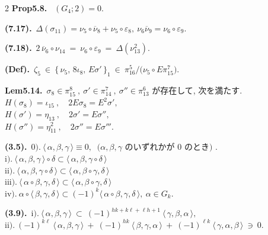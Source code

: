 \documentclass[10pt, leqno]{ltjsarticle}
\newcommand{\ov}[1]{\overline{#1}}
\newcommand{\todai}[2][]{\{\,#2\,\}_{#1}}      %
\newcommand{\todas}[1]{\langle\,#1\,\rangle}
\newcommand{\gen}[1]{\{#1\}}       %
\numberwithin{equation}{section}
\theoremstyle{plain}
\theoremstyle{definition}
\theoremstyle{remark}
\begin{document}
\begin{paracol}{2}
\noindent
\textbf{Prop5.8.}\
\((G_{4};2)=0.\)

\noindent
\textbf{(7.17).}\
\(\Delta(\sigma_{11}) = \nu_5\circ\ov{\nu}_8 + \nu_5\circ\varepsilon_8,\
\nu_6\ov{\nu}_9 = \nu_6\circ\varepsilon_9 .\)

\noindent
\textbf{(7.18).}\
\(2\,\overline{\nu}_{6}\circ \nu_{14}
\ =\ \nu_{6}\circ\varepsilon_{9}
\ =\ \Delta(\nu_{13}^{2}).\)

\noindent
\textbf{(Def).}\
\(\zeta_{5}\ \in\ \todai[1]{\nu_{5},\,8\iota_{8},\,E\sigma'}
\ \in\ \pi^{5}_{16}/\bigl(\nu_{5}\circ E\pi^{7}_{15}\bigr)\).

\noindent
\textbf{Lem5.14.}\
\(\sigma_{8}\in\pi^{8}_{15}\ , \ \sigma'\in\pi^{7}_{14}\ , \ \sigma''\in\pi^{6}_{13}\) 
が存在して, 次を満たす. \\
\(H(\sigma_{8})=\iota_{15} \ ,\quad 2E\sigma_{8}=E^{2}\sigma',\)\\
\(H(\sigma')=\eta_{13} \ ,\quad 2\sigma'=E\sigma'',\)\\
\(H(\sigma'')=\eta_{11}^2 \ ,\quad 2\sigma''=E\sigma''' .\)

\noindent
\textbf{(3.5).}\
\(\text{0).}\ \todas{\alpha, \beta, \gamma}\equiv 0,
\ \text{ ($\alpha,\beta,\gamma$ のいずれかが $0$ のとき) }\).\\
\(\text{i).}\ \todas{\alpha, \beta, \gamma}\circ\delta
\subset \todas{\alpha, \beta, \gamma\circ\delta}\)\\
\(\text{ii).}\ \todas{\alpha, \beta, \gamma\circ\delta}
\subset \todas{\alpha, \beta\circ\gamma, \delta}\)\\
\(\text{iii).}\ \todas{\alpha\circ\beta, \gamma, \delta}
\subset \todas{\alpha, \beta\circ\gamma, \delta}\)\\
\(\text{iv).}\ \alpha\circ\todas{\beta, \gamma, \delta}
\subset (-1)^k\todas{\alpha\circ\beta, \gamma, \delta},\ \alpha\in G_k .\)

\noindent
\textbf{(3.9).}\
\(\text{i).}\ \todas{\alpha,\beta,\gamma}\ \subset\
(-1)^{hk+k\ell+\ell h+1}\ \todas{\gamma,\beta,\alpha},\)\\
\(\text{ii).}\ (-1)^{k\ell}\ \todas{\alpha,\beta,\gamma}\ +\
(-1)^{hk}\ \todas{\beta,\gamma,\alpha}\ +\
(-1)^{\ell k}\ \todas{\gamma,\alpha,\beta}\ \ni\ 0 .\)




\end{paracol}
\end{document}
